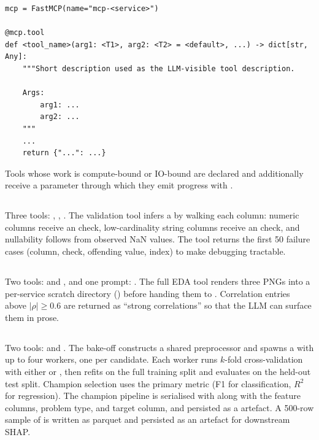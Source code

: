 \begin{lstlisting}[caption={MCP server module template.},
                    label={lst:server-template}]
mcp = FastMCP(name="mcp-<service>")

@mcp.tool
def <tool_name>(arg1: <T1>, arg2: <T2> = <default>, ...) -> dict[str, Any]:
    """Short description used as the LLM-visible tool description.

    Args:
        arg1: ...
        arg2: ...
    """
    ...
    return {"...": ...}
\end{lstlisting}

Tools whose work is compute-bound or IO-bound are declared
 and additionally receive a 
parameter through which they emit progress with
.

\subsection{}
Three tools: ,
, .
The validation tool infers a  by
walking each column: numeric columns receive an  check,
low-cardinality string columns receive an  check, and
nullability follows from observed NaN values. The tool returns the
first 50 failure cases (column, check, offending value, index) to
make debugging tractable.

\subsection{}
Two tools:  and ,
and one prompt: . The full EDA tool renders
three PNGs into a per-service scratch directory
() before handing them to
. Correlation entries above $|\rho|\ge 0.6$ are
returned as ``strong correlations'' so that the LLM can surface them
in prose.

\subsection{}
Two tools:  and
.
The bake-off constructs a shared
 preprocessor and spawns a
 with up to four workers, one per
candidate. Each worker runs $k$-fold cross-validation with either
 or , then refits on the full training
split and evaluates on the held-out test split. Champion selection
uses the primary metric (F1 for classification, $R^2$ for
regression). The champion pipeline is serialised with 
along with the feature columns, problem type, and target column, and
persisted as a  artefact. A 500-row sample of
 is written as parquet and persisted as an
 artefact for downstream SHAP.

